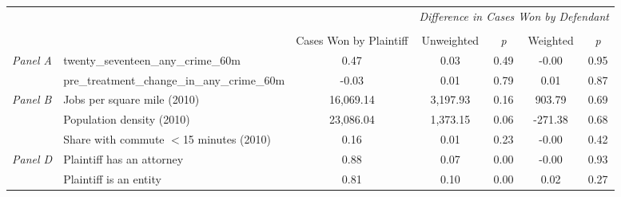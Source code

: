 \begin{tabular}{llccccc}
\toprule
 &  & \textit{} & \multicolumn{4}{c}{\textit{Difference in Cases Won by Defendant}} \\
\cline{4-7}
\\
 &  & Cases Won by Plaintiff & Unweighted & \emph{p} & Weighted & \emph{p} \\
\midrule
\multirow[c]{2}{3cm}{\textit{Panel A}} & twenty_seventeen_any_crime_60m & 0.47 & 0.03 & 0.49 & -0.00 & 0.95 \\
 & pre_treatment_change_in_any_crime_60m & -0.03 & 0.01 & 0.79 & 0.01 & 0.87 \\
\cline{1-7}
\multirow[c]{3}{3cm}{\textit{Panel B}} & Jobs per square mile (2010) & 16,069.14 & 3,197.93 & 0.16 & 903.79 & 0.69 \\
 & Population density (2010) & 23,086.04 & 1,373.15 & 0.06 & -271.38 & 0.68 \\
 & Share with commute $<$15 minutes (2010) & 0.16 & 0.01 & 0.23 & -0.00 & 0.42 \\
\cline{1-7}
\multirow[c]{2}{3cm}{\textit{Panel D}} & Plaintiff has an attorney & 0.88 & 0.07 & 0.00 & -0.00 & 0.93 \\
 & Plaintiff is an entity & 0.81 & 0.10 & 0.00 & 0.02 & 0.27 \\
\cline{1-7}
\bottomrule
\end{tabular}
